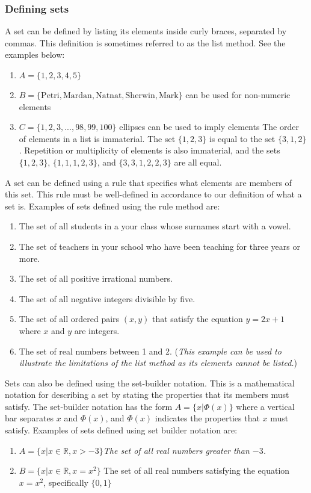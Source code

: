 \subsubsection{Defining sets}
A set can be defined by listing its elements inside curly braces, separated by commas. This definition is sometimes referred to as the list method. See the examples below:
\begin{enumerate}
\item $A = \{1, 2, 3, 4, 5\}$
\item $B = \{\mathrm{Petri, Mardan, Natnat, Sherwin, Mark}\}$	can be used for non-numeric elements
\item $C = \{1, 2, 3, ..., 98, 99, 100\}$	ellipses can be used to imply elements
The order of elements in a list is immaterial. The set $\{1, 2, 3\}$ is equal to the set $\{3, 1, 2\}$. Repetition or multiplicity of elements is also immaterial, and the sets $\{1, 2, 3\}$, $\{1, 1, 1, 2, 3\}$, and $\{3, 3, 1, 2, 2, 3\}$ are all equal.
\end{enumerate}
A set can be defined using a rule that specifies what elements are members of this set. This rule must be well-defined in accordance to our definition of what a set is. Examples of sets defined using the rule method are:
\begin{enumerate}
\item The set of all students in a your class whose surnames start with a vowel.
\item The set of teachers in your school who have been teaching for three years or more.
\item The set of all positive irrational numbers.
\item The set of all negative integers divisible by five.
\item The set of all ordered pairs $(x,y)$ that satisfy the equation $y=2x+1$ where $x$ and $y$ are integers.
\item The set of real numbers between 1 and 2. (\textit{This example can be used to illustrate the limitations of the list method as its elements cannot be listed.})
\end{enumerate}
Sets can also be defined using the set-builder notation. This is a mathematical notation for describing a set by stating the properties that its members must satisfy. The set-builder notation has the form $A=\{x|\Phi(x)\}$ where a vertical bar separates $x$ and $\Phi(x)$, and $\Phi(x)$  indicates the properties that $x$ must satisfy. Examples of sets defined using set builder notation are:
\begin{enumerate}
\item $A=\{x|x\in\mathbb{R},x>-3\}$\hfill\textit{The set of all real numbers greater than $-3$.}
\item $B=\{x|x\in\mathbb{R},x=x^2\}$ 	The set of all real numbers satisfying the	equation $x=x^2$, specifically $\{0, 1\}$
\end{enumerate}

